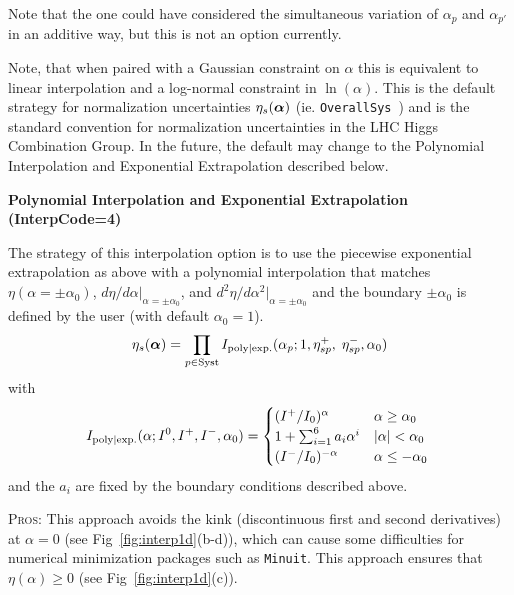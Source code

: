 \documentclass{cernrep}
\def\vec#1{\ifmmode
\mathchoice{\mbox{\boldmath$\displaystyle\bf#1$}}
{\mbox{\boldmath$\textstyle\bf#1$}}
{\mbox{\boldmath$\scriptstyle\bf#1$}}
{\mbox{\boldmath$\scriptscriptstyle\bf#1$}}\else
{\mbox{\boldmath$\bf#1$}}\fi}
\newcommand{\OS}{\texttt{OverallSys}}
\begin{document}
Note that the one could have considered the simultaneous variation of $\alpha_{p}$ and $\alpha_{p'}$ in an additive way, but this is not an option currently.

Note, that when paired with a Gaussian constraint on $\alpha$ this is equivalent to  linear interpolation and a log-normal constraint in $\ln(\alpha)$.  This is the default strategy for normalization uncertainties $\eta_{s}(\vec{\alpha})$ (ie. \OS\ ) and is the standard convention for normalization uncertainties in the LHC Higgs Combination Group.  In the future, the default may change to the Polynomial Interpolation and Exponential Extrapolation described below.

{\flushleft \bf Polynomial Interpolation and Exponential Extrapolation (InterpCode=4)}

The strategy of this interpolation option is to use the piecewise exponential extrapolation as above with a polynomial interpolation that matches $\eta(\alpha=\pm\alpha_0)$, $d\eta/d\alpha |_{\alpha=\pm\alpha_0}$, and $d^2\eta/d\alpha^2 |_{\alpha=\pm\alpha_0}$ and the boundary $\pm\alpha_0$ is defined by the user (with default $\alpha_0=1$).  
\begin{equation}
\eta_s ({\boldsymbol \alpha}) = \prod_{p\in\textrm{Syst}} I_{\rm poly|exp.}(\alpha_p; 1,\eta_{sp}^+, \; \eta_{sp}^- , \alpha_0) 
\end{equation}
with
\begin{equation}
 I_{\rm poly|exp.}(\alpha;  I^0, I^+,I^- , \alpha_0) =
 \begin{cases}
      (I^+/I_0)^ \alpha  &  \text{$\alpha\ge \alpha_0$} \\
     1+\sum_{i=1}^6 a_i \alpha^i  &  \text{$|\alpha|< \alpha_0$} \\
      (I^-/I_0)^{-\alpha}  &  \text{$\alpha\le-\alpha_0$ }
 \end{cases}
\end{equation}
and the $a_i$ are fixed by the boundary conditions described above.

\textsc{Pros:} This approach avoids the kink (discontinuous first and second derivatives) at $\alpha=0$ (see Fig~\ref{fig:interp1d}(b-d)), which can cause some difficulties for numerical minimization packages such as \texttt{Minuit}.  This approach ensures that $\eta(\alpha)\ge 0$ (see Fig~\ref{fig:interp1d}(c)). 
\end{document}
